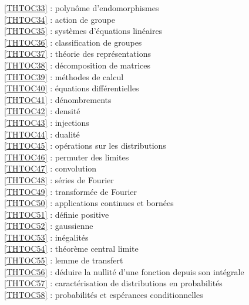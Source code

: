 \ref {THTOC33} : polynôme d'endomorphismes\\
\ref {THTOC34} : action de groupe\\
\ref {THTOC35} : systèmes d'équations linéaires\\
\ref {THTOC36} : classification de groupes\\
\ref {THTOC37} : théorie des représentations\\
\ref {THTOC38} : décomposition de matrices\\
\ref {THTOC39} : méthodes de calcul\\
\ref {THTOC40} : équations différentielles\\
\ref {THTOC41} : dénombrements\\
\ref {THTOC42} : densité\\
\ref {THTOC43} : injections\\
\ref {THTOC44} : dualité\\
\ref {THTOC45} : opérations sur les distributions\\
\ref {THTOC46} : permuter des limites\\
\ref {THTOC47} : convolution\\
\ref {THTOC48} : séries de Fourier\\
\ref {THTOC49} : transformée de Fourier\\
\ref {THTOC50} : applications continues et bornées\\
\ref {THTOC51} : définie positive\\
\ref {THTOC52} : gaussienne\\
\ref {THTOC53} : inégalités\\
\ref {THTOC54} : théorème central limite\\
\ref {THTOC55} : lemme de transfert\\
\ref {THTOC56} : déduire la nullité d'une fonction depuis son intégrale\\
\ref {THTOC57} : caractérisation de distributions en probabilités\\
\ref {THTOC58} : probabilités et espérances conditionnelles\\
